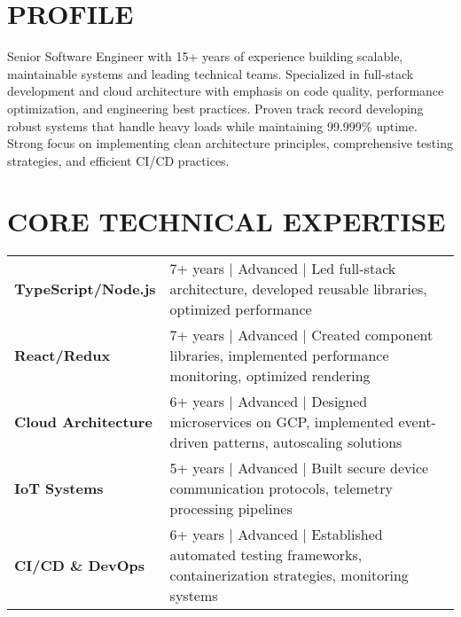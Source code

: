 \documentclass{fullstackdeveloper-ats}
\begin{document}

\vspace{0.3cm}

\section{PROFILE}
\justify
Senior Software Engineer with 15+ years of experience building scalable, maintainable systems and leading technical teams. Specialized in full-stack development and cloud architecture with emphasis on code quality, performance optimization, and engineering best practices. Proven track record developing robust systems that handle heavy loads while maintaining 99.999\% uptime. Strong focus on implementing clean architecture principles, comprehensive testing strategies, and efficient CI/CD practices.

\section{CORE TECHNICAL EXPERTISE}
\begin{tabular}{p{3.5cm}p{13cm}}
\textbf{TypeScript/Node.js} & 7+ years | Advanced | Led full-stack architecture, developed reusable libraries, optimized performance \\[0.2cm]

\textbf{React/Redux} & 7+ years | Advanced | Created component libraries, implemented performance monitoring, optimized rendering \\[0.2cm]

\textbf{Cloud Architecture} & 6+ years | Advanced | Designed microservices on GCP, implemented event-driven patterns, autoscaling solutions \\[0.2cm]

\textbf{IoT Systems} & 5+ years | Advanced | Built secure device communication protocols, telemetry processing pipelines \\[0.2cm]

\textbf{CI/CD \& DevOps} & 6+ years | Advanced | Established automated testing frameworks, containerization strategies, monitoring systems \\
\end{tabular}
\end{document}
